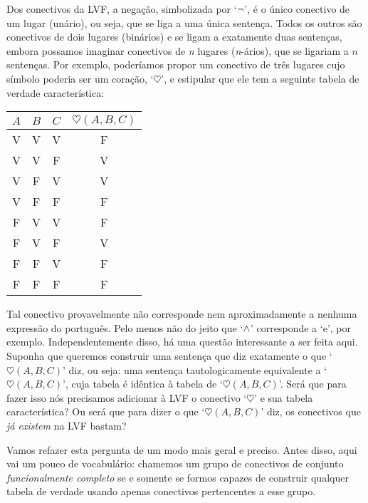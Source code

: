 
Dos conectivos da LVF, a negação, simbolizada por `$\neg$', é o único conectivo de um lugar (unário), ou seja, que se liga a uma única sentença. Todos os outros são conectivos de dois lugares (binários) e se ligam a exatamente duas sentenças, embora possamos imaginar conectivos de \textit{n} lugares (\textit{n}-ários), que se ligariam a $n$ sentenças. Por exemplo, poderíamos propor um conectivo de três lugares cujo símbolo poderia ser um coração, `$\heartsuit$', e estipular que ele tem a seguinte tabela de verdade característica:

\begin{center}
\begin{tabular}{c c c | c}
$A$ & $B$ & $C$ & $\heartsuit(A,B,C)$\\
\hline
 V & V & V & F \\
 V & V & F & V \\
 V & F & V & V \\
 V & F & F & F \\
 F & V & V & F \\
 F & V & F & V \\
 F & F & V & F \\
 F & F & F & F
\end{tabular}
\end{center}
Tal conectivo provavelmente não corresponde nem aproximadamente a nenhuma expressão do português. Pelo menos não do jeito que `$\wedge$' corresponde a `e', por exemplo. Independentemente disso, há uma questão interessante a ser feita aqui. Suponha que queremos construir uma sentença que diz exatamente o que `$\heartsuit(A,B,C)$' diz, ou seja: uma sentença tautologicamente equivalente a `$\heartsuit(A,B,C)$', cuja tabela é idêntica à tabela de `$\heartsuit(A,B,C)$'.
Será que para fazer isso nós precisamos adicionar à LVF o conectivo `$\heartsuit$' e sua tabela característica?
Ou será que para dizer o que `$\heartsuit(A,B,C)$' diz, os conectivos que \emph{já existem} na LVF bastam?

Vamos refazer esta pergunta de um modo mais geral e preciso. Antes disso, aqui vai um pouco de vocabulário: chamemos um grupo de conectivos de conjunto \textit{funcionalmente completo} se e somente se formos capazes de construir qualquer tabela de verdade usando apenas conectivos pertencentes a esse grupo.

